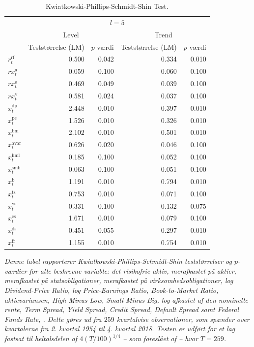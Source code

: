 \documentclass[
  a4paper,
  oneside]{memoir}
\begin{document}
\begin{table}[H]

\caption{\label{tab:STAT-KPSS}Kwiatkowski-Phillips-Schmidt-Shin Test.}
\centering
\begin{threeparttable}
\begin{tabular}[t]{lrrrr}
\toprule
\multicolumn{1}{c}{ } & \multicolumn{4}{c}{$l=5$} \\
\cmidrule(l{3pt}r{3pt}){2-5}
\multicolumn{1}{c}{ } & \multicolumn{2}{c}{Level} & \multicolumn{2}{c}{Trend} \\
\cmidrule(l{3pt}r{3pt}){2-3} \cmidrule(l{3pt}r{3pt}){4-5}
  & Teststørrelse (LM) & $p$-værdi & Teststørrelse (LM) & $p$-værdi\\
\midrule
\rowcolor{gray!6}  $r_t^{\text{rf}}$ & 0.500 & 0.042 & 0.334 & 0.010\\
$rx_t^{\text{a}}$ & 0.059 & 0.100 & 0.060 & 0.100\\
\rowcolor{gray!6}  $rx_t^{\text{s}}$ & 0.469 & 0.049 & 0.039 & 0.100\\
$rx_t^{\text{v}}$ & 0.581 & 0.024 & 0.037 & 0.100\\
\rowcolor{gray!6}  $x_t^{\text{dp}}$ & 2.448 & 0.010 & 0.397 & 0.010\\
$x_t^{\text{pe}}$ & 1.526 & 0.010 & 0.326 & 0.010\\
\rowcolor{gray!6}  $x_t^{\text{bm}}$ & 2.102 & 0.010 & 0.501 & 0.010\\
$x_t^{\text{avar}}$ & 0.626 & 0.020 & 0.046 & 0.100\\
\rowcolor{gray!6}  $x_t^{\text{hml}}$ & 0.185 & 0.100 & 0.052 & 0.100\\
$x_t^{\text{smb}}$ & 0.063 & 0.100 & 0.051 & 0.100\\
\rowcolor{gray!6}  $x_t^{\text{b}}$ & 1.191 & 0.010 & 0.794 & 0.010\\
$x_t^{\text{ts}}$ & 0.753 & 0.010 & 0.071 & 0.100\\
\rowcolor{gray!6}  $x_t^{\text{ys}}$ & 0.331 & 0.100 & 0.132 & 0.075\\
$x_t^{\text{cs}}$ & 1.671 & 0.010 & 0.079 & 0.100\\
\rowcolor{gray!6}  $x_t^{\text{ds}}$ & 0.451 & 0.055 & 0.297 & 0.010\\
$x_t^{\text{fr}}$ & 1.155 & 0.010 & 0.754 & 0.010\\
\bottomrule
\end{tabular}
\begin{tablenotes}
\item \textit{Denne tabel rapporterer Kwiatkowski-Phillips-Schmidt-Shin teststørrelser og $p$-værdier for alle beskrevne variable: det risikofrie aktiv, merafkastet på aktier, merafkastet på statsobligationer, merafkastet på virksomhedsobligationer, log Dividend-Price Ratio, log Price-Earnings Ratio, Book-to-Market Ratio, aktievariansen, High Minus Low, Small Minus Big, log afkastet af den nominelle rente, Term Spread, Yield Spread, Credit Spread, Default Spread samt Federal Funds Rate, \citep{Kwiatkowski1992}. Dette gøres ud fra $259$ kvartalvise observationer, som spænder over kvartalerne fra 2. kvartal 1954 til 4. kvartal 2018. Testen er udført for et lag fastsat til heltalsdelen af $4(T/100)^{1/4}$ -- som foreslået af \citep{Schwert1989} -- hvor $T=259$.}

\end{tablenotes}
\end{threeparttable}
\end{table}
\end{document}
